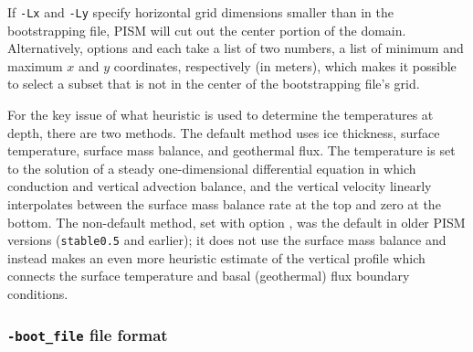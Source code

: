 If \texttt{-Lx} and \texttt{-Ly} specify horizontal grid dimensions smaller than in the bootstrapping file, PISM will cut out the center portion of the domain.  Alternatively, options  and  each take a list of two numbers, a list of minimum and maximum $x$ and $y$ coordinates, respectively (in meters), which makes it possible to select a subset that is not in the center of the bootstrapping file's grid.

For the key issue of what heuristic is used to determine the temperatures at depth, there are two methods.  The default method uses ice thickness, surface temperature, surface mass balance, and geothermal flux.  The temperature is set to the solution of a steady one-dimensional differential equation in which conduction and vertical advection balance, and the vertical velocity linearly interpolates between the surface mass balance rate at the top and zero at the bottom.  The non-default method, set with option , was the default in older PISM versions (\texttt{stable0.5} and earlier); it does not use the surface mass balance and instead makes an even more heuristic estimate of the vertical profile which connects the surface temperature and basal (geothermal) flux boundary conditions.

\subsubsection*{\texttt{-boot_file} file format}
\label{sec:bootstrapping-format}


